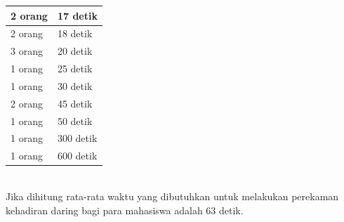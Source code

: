 \begin{enumerate}
\begin{table}[ht]
\begin{tabular}{|p{4cm} |p{7cm}|}
			2 orang &  17 detik\\ \hline 
			2 orang &  18 detik\\ \hline 
			3 orang &  20 detik\\ \hline
			1 orang &  25 detik\\ \hline 
			1 orang &  30 detik\\ \hline 
			2 orang &  45 detik\\ \hline
			1 orang &  50 detik\\ \hline 
			1 orang &  300 detik\\ \hline 
			1 orang &  600 detik\\ \hline		
		\end{tabular}
		\label{tab:daringMahasiswa}
	\end{table}\\
	Jika dihitung rata-rata waktu yang dibutuhkan untuk melakukan perekaman kehadiran daring bagi para mahasiswa adalah 63 detik.
	

\end{enumerate}
